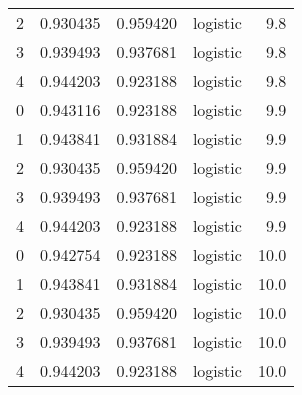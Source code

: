 \begin{tabular}{rrrlr}
     2 & 0.930435 & 0.959420 & logistic &        9.8 \\
     3 & 0.939493 & 0.937681 & logistic &        9.8 \\
     4 & 0.944203 & 0.923188 & logistic &        9.8 \\
     0 & 0.943116 & 0.923188 & logistic &        9.9 \\
     1 & 0.943841 & 0.931884 & logistic &        9.9 \\
     2 & 0.930435 & 0.959420 & logistic &        9.9 \\
     3 & 0.939493 & 0.937681 & logistic &        9.9 \\
     4 & 0.944203 & 0.923188 & logistic &        9.9 \\
     0 & 0.942754 & 0.923188 & logistic &       10.0 \\
     1 & 0.943841 & 0.931884 & logistic &       10.0 \\
     2 & 0.930435 & 0.959420 & logistic &       10.0 \\
     3 & 0.939493 & 0.937681 & logistic &       10.0 \\
     4 & 0.944203 & 0.923188 & logistic &       10.0 \\
\bottomrule
\end{tabular}
